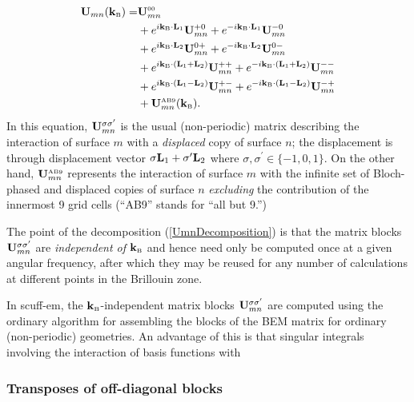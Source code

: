 \begin{align}
\mathbf{U}_{mn}(\mathbf{k}_{\hbox{\tiny{B}}})
 =   &\mathbf{U}_{mn}^{\hbox{\tiny{00}}}
\label{UmnDecomposition}\\
   & + e^{ i \mathbf{k}_{\hbox{\tiny{B}}} \cdot \mathbf{L}_1} \mathbf{U}_{mn}^{+0}
     + e^{-i \mathbf{k}_{\hbox{\tiny{B}}} \cdot \mathbf{L}_1} \mathbf{U}_{mn}^{-0}
\nonumber \\
   & + e^{ i \mathbf{k}_{\hbox{\tiny{B}}} \cdot \mathbf{L}_2} \mathbf{U}_{mn}^{0+}
     + e^{-i \mathbf{k}_{\hbox{\tiny{B}}} \cdot \mathbf{L}_2} \mathbf{U}_{mn}^{0-}
\nonumber \\
   & + e^{ i \mathbf{k}_{\hbox{\tiny{B}}} \cdot (\mathbf{L}_1+\mathbf{L}_2)} \mathbf{U}_{mn}^{++}
     + e^{-i \mathbf{k}_{\hbox{\tiny{B}}} \cdot (\mathbf{L}_1+\mathbf{L}_2)} \mathbf{U}_{mn}^{--}
\nonumber \\
   & + e^{ i \mathbf{k}_{\hbox{\tiny{B}}} \cdot (\mathbf{L}_1-\mathbf{L}_2)} \mathbf{U}_{mn}^{+-}
     + e^{-i \mathbf{k}_{\hbox{\tiny{B}}} \cdot (\mathbf{L}_1-\mathbf{L}_2)} \mathbf{U}_{mn}^{-+}
\nonumber \\
   & + \mathbf{U}_{mn}^{\hbox{\tiny{AB9}}}(\mathbf{k}_{\hbox{\tiny{B}}}).
\nonumber
\end{align}
In this equation, $\mathbf{U}_{mn}^{\sigma \sigma^\prime}$ is the usual 
(non-periodic) matrix describing the interaction of surface $m$ 
with a \textit{displaced} copy of surface $n$; the displacement 
is through displacement vector $\sigma \mathbf{L}_1 + \sigma^\prime \mathbf{L}_2$
where $\sigma,\sigma^\prime \in \{-1,0,1\}.$ 
On the other hand, $\mathbf{U}_{mn}^{\hbox{\tiny{AB9}}}$ represents the interaction
of surface $m$ with the infinite set of Bloch-phased 
and displaced copies of surface $n$ \textit{excluding} the contribution
of the innermost 9 grid cells (``AB9'' stands for ``all but 9.'')

The point of the decomposition (\ref{UmnDecomposition}) is that 
the matrix blocks $\mathbf{U}_{mn}^{\sigma\sigma^\prime}$ are 
\textit{independent of $\mathbf{k}_{\hbox{\tiny{B}}}$} and hence need only be computed 
once at a given angular frequency, after which they may be reused
for any number of calculations at different points in the Brillouin
zone. 

In {\sc scuff-em}, the $\mathbf{k}_{\hbox{\tiny{B}}}$-independent matrix blocks 
$\mathbf{U}_{mn}^{\sigma\sigma^\prime}$ are computed using the ordinary
algorithm for assembling the blocks of the BEM matrix 
for ordinary (non-periodic) geometries. An advantage of this
is that singular integrals involving the interaction
of basis functions with 


\subsubsection*{Transposes of off-diagonal blocks}

